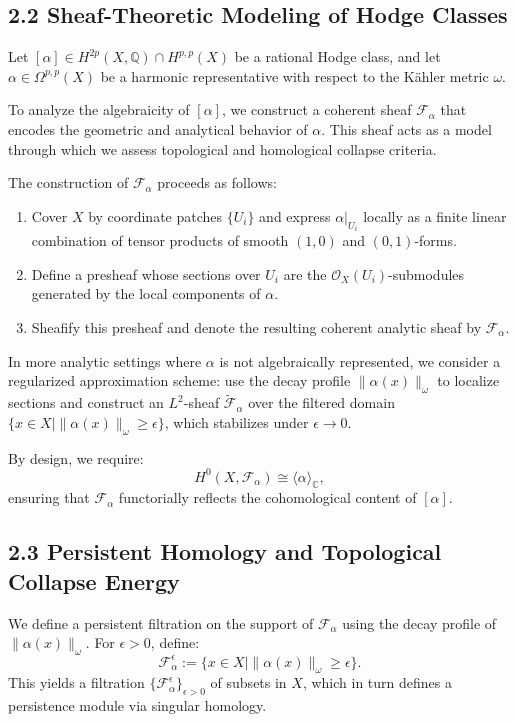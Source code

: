 \documentclass[11pt]{article}
\begin{document}
\subsection{2.2 Sheaf-Theoretic Modeling of Hodge Classes}

Let $[\alpha] \in H^{2p}(X, \mathbb{Q}) \cap H^{p,p}(X)$ be a rational Hodge class, and let $\alpha \in \Omega^{p,p}(X)$ be a harmonic representative with respect to the Kähler metric $\omega$.

To analyze the algebraicity of $[\alpha]$, we construct a coherent sheaf $\mathcal{F}_\alpha$ that encodes the geometric and analytical behavior of $\alpha$. This sheaf acts as a model through which we assess topological and homological collapse criteria.

The construction of $\mathcal{F}_\alpha$ proceeds as follows:
\begin{enumerate}
  \item Cover $X$ by coordinate patches $\{U_i\}$ and express $\alpha|_{U_i}$ locally as a finite linear combination of tensor products of smooth $(1,0)$ and $(0,1)$-forms.
  \item Define a presheaf whose sections over $U_i$ are the $\mathcal{O}_X(U_i)$-submodules generated by the local components of $\alpha$.
  \item Sheafify this presheaf and denote the resulting coherent analytic sheaf by $\mathcal{F}_\alpha$.
\end{enumerate}

In more analytic settings where $\alpha$ is not algebraically represented, we consider a regularized approximation scheme: use the decay profile $\|\alpha(x)\|_\omega$ to localize sections and construct an $L^2$-sheaf $\widetilde{\mathcal{F}}_\alpha$ over the filtered domain $\{x \in X \mid \|\alpha(x)\|_\omega \geq \epsilon\}$, which stabilizes under $\epsilon \to 0$.

By design, we require:
\[
H^0(X, \mathcal{F}_\alpha) \cong \langle \alpha \rangle_{\mathbb{C}},
\]
ensuring that $\mathcal{F}_\alpha$ functorially reflects the cohomological content of $[\alpha]$.

\subsection{2.3 Persistent Homology and Topological Collapse Energy}

We define a persistent filtration on the support of $\mathcal{F}_\alpha$ using the decay profile of $\|\alpha(x)\|_\omega$. For $\epsilon > 0$, define:
\[
\mathcal{F}_\alpha^{\epsilon} := \{ x \in X \mid \| \alpha(x) \|_\omega \geq \epsilon \}.
\]
This yields a filtration $\{ \mathcal{F}_\alpha^\epsilon \}_{\epsilon > 0}$ of subsets in $X$, which in turn defines a persistence module via singular homology.
\end{document}
